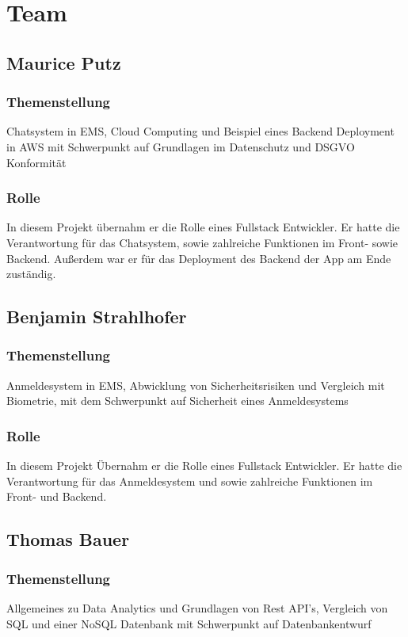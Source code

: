 \newpage
\section{Team}
\subsection{Maurice Putz}
\subsubsection{Themenstellung}
Chatsystem in EMS, Cloud Computing und Beispiel eines Backend Deployment in AWS mit Schwerpunkt auf Grundlagen im Datenschutz und DSGVO Konformität
\subsubsection{Rolle}
In diesem Projekt übernahm er die Rolle eines Fullstack Entwickler. Er hatte die Verantwortung für das Chatsystem,
sowie zahlreiche Funktionen im Front- sowie Backend. Außerdem war er für das Deployment des Backend der App am Ende zuständig.

\subsection{Benjamin Strahlhofer}
\subsubsection{Themenstellung}
Anmeldesystem in EMS, Abwicklung von Sicherheitsrisiken und Vergleich mit Biometrie, mit dem Schwerpunkt auf Sicherheit eines Anmeldesystems
\subsubsection{Rolle}
In diesem Projekt Übernahm er die Rolle eines Fullstack Entwickler. Er hatte die Verantwortung für das Anmeldesystem und 
sowie zahlreiche Funktionen im Front- und Backend.

\subsection{Thomas Bauer}
\subsubsection{Themenstellung}
Allgemeines zu Data Analytics und Grundlagen von Rest API's, Vergleich von SQL und einer NoSQL Datenbank mit Schwerpunkt auf Datenbankentwurf
